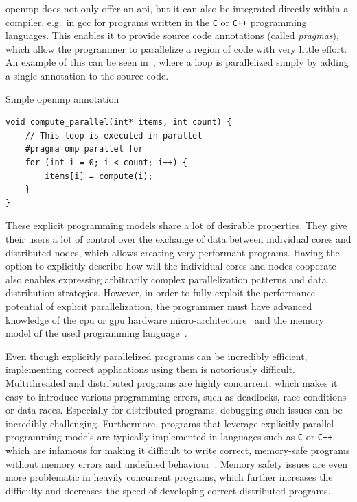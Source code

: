 \begin{description}
		\gls{openmp} does not only offer an \gls{api}, but it can also be
		integrated directly within a compiler, e.g.\ in \gls{gcc} for programs written in
		the \texttt{C} or \texttt{C++} programming languages. This enables it
		to provide source code annotations (called \emph{pragmas}), which allow the programmer
		to parallelize a region of code with very little effort. An example of this can be seen
		in~, where a loop is parallelized simply by adding a single annotation to
		the source code.

		\begin{listing}
			\caption{Simple \gls{openmp} annotation}
			\label{lst:openmp-annotation}
			\begin{verbatim}
void compute_parallel(int* items, int count) {
    // This loop is executed in parallel
    #pragma omp parallel for
    for (int i = 0; i < count; i++) {
        items[i] = compute(i);
    }
}
        \end{verbatim}
		\end{listing}
\end{description}

These explicit programming models share a lot of desirable properties. They give their users a lot
of control over the exchange of data between individual cores and distributed nodes, which allows
creating very performant programs. Having the option to explicitly describe how will the individual
cores and nodes cooperate also enables expressing arbitrarily complex parallelization patterns and
data distribution strategies. However, in order to fully exploit the performance potential of
explicit parallelization, the programmer must have advanced knowledge of the
\gls{cpu} or \gls{gpu} hardware
micro-architecture~\cite{intel_developer_manual} and the memory model of the used programming
language~\cite{cpp11_standard}.

Even though explicitly parallelized programs can be incredibly efficient, implementing correct
applications using them is notoriously difficult. Multithreaded and distributed programs are highly
concurrent, which makes it easy to introduce various programming errors, such as deadlocks, race
conditions or data races. Especially for distributed programs, debugging such issues can be
incredibly challenging. Furthermore, programs that leverage explicitly parallel programming models
are typically implemented in languages such as \texttt{C} or
\texttt{C++}, which are infamous for making it difficult to write correct,
memory-safe programs without memory errors and undefined behaviour~\cite{memory_safety_report}.
Memory safety issues are even more problematic in heavily concurrent programs, which further
increases the difficulty and decreases the speed of developing correct distributed programs.

